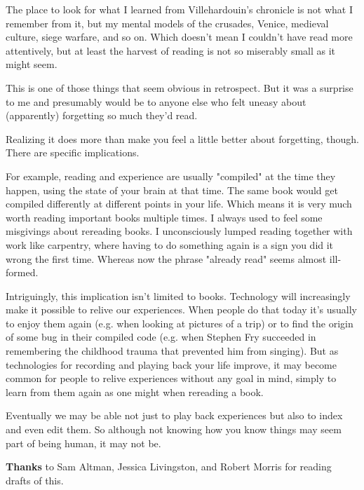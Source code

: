 The place to look for what I learned from
                  Villehardouin's chronicle is not what I remember from it, but
                  my mental models of the crusades, Venice, medieval culture,
                  siege warfare, and so on. Which doesn't mean I couldn't have
                  read more attentively, but at least the harvest of reading is
                  not so miserably small as it might seem.

This is
                  one of those things that seem obvious in retrospect. But it
                  was a surprise to me and presumably would be to anyone else
                  who felt uneasy about (apparently) forgetting so much they'd
                  read.

Realizing it does more than make you feel a
                  little better about forgetting, though. There are specific
                  implications.

For example, reading and experience
                  are usually "compiled" at the time they happen, using the
                  state of your brain at that time. The same book would get
                  compiled differently at different points in your life. Which
                  means it is very much worth reading important books multiple
                  times. I always used to feel some misgivings about rereading
                  books. I unconsciously lumped reading together with work like
                  carpentry, where having to do something again is a sign you
                  did it wrong the first time. Whereas now the phrase "already
                  read" seems almost ill-formed.

Intriguingly, this
                  implication isn't limited to books. Technology will
                  increasingly make it possible to relive our experiences. When
                  people do that today it's usually to enjoy them again (e.g.
                  when looking at pictures of a trip) or to find the origin of
                  some bug in their compiled code (e.g. when Stephen Fry
                  succeeded in remembering the childhood trauma that prevented
                  him from singing). But as technologies for recording and
                  playing back your life improve, it may become common for
                  people to relive experiences without any goal in mind, simply
                  to learn from them again as one might when rereading a
                  book.

Eventually we may be able not just to play
                  back experiences but also to index and even edit them. So
                  although not knowing how you know things may seem part of
                  being human, it may not be.








                  \textbf{Thanks} to Sam Altman, Jessica Livingston, and Robert
                  Morris for reading drafts of this.


              
            
          
